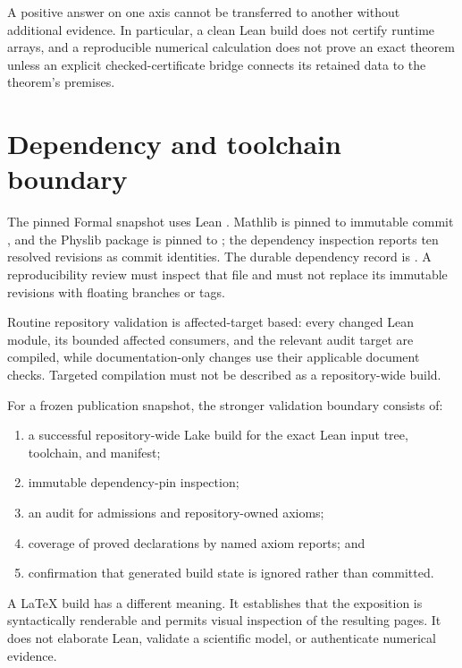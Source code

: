 A positive answer on one axis cannot be transferred to another without additional
evidence. In particular, a clean Lean build does not certify runtime arrays, and a
reproducible numerical calculation does not prove an exact theorem unless an explicit
checked-certificate bridge connects its retained data to the theorem's premises.

\section{Dependency and toolchain boundary}

The pinned Formal snapshot uses Lean . Mathlib is pinned to immutable commit
, and the Physlib package is pinned to
; the dependency inspection reports ten
resolved revisions as commit identities. The durable dependency record is
. A reproducibility review must inspect that file and must
not replace its immutable revisions with floating branches or tags.

Routine repository validation is affected-target based: every changed Lean module, its
bounded affected consumers, and the relevant audit target are compiled, while documentation-only
changes use their applicable document checks. Targeted compilation must not be described as a repository-wide build.

For a frozen publication snapshot, the stronger validation boundary consists of:

\begin{enumerate}
  \item a successful repository-wide Lake build for the exact Lean input tree, toolchain, and manifest;
  \item immutable dependency-pin inspection;
  \item an audit for admissions and repository-owned axioms;
  \item coverage of proved declarations by named axiom reports; and
  \item confirmation that generated build state is ignored rather than committed.
\end{enumerate}

A LaTeX build has a different meaning. It establishes that the exposition is
syntactically renderable and permits visual inspection of the resulting pages. It does
not elaborate Lean, validate a scientific model, or authenticate numerical evidence.

